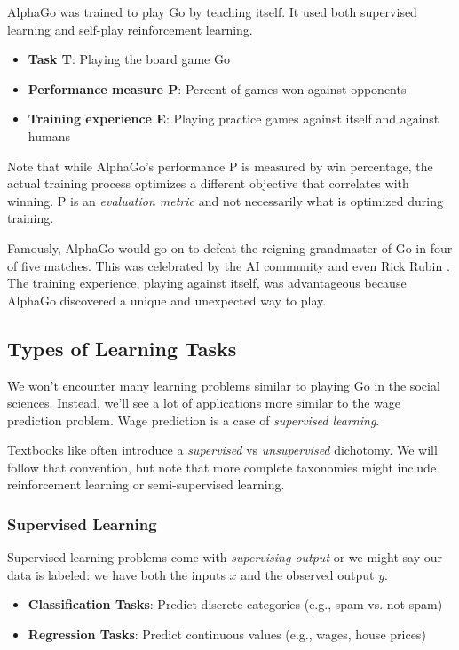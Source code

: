 AlphaGo was trained to play Go by teaching itself. It used both supervised learning and self-play reinforcement learning.

\begin{itemize}
\item \textbf{Task T}: Playing the board game Go
\item \textbf{Performance measure P}: Percent of games won against opponents
\item \textbf{Training experience E}: Playing practice games against itself and against humans
\end{itemize}

Note that while AlphaGo's performance P is measured by win percentage, the actual training process optimizes a different objective that correlates with winning. P is an \textit{evaluation metric} and not necessarily what is optimized during training.

Famously, AlphaGo would go on to defeat the reigning grandmaster of Go in four of five matches. This was celebrated by the AI community and even Rick Rubin \cite{rubin2023creative}. The training experience, playing against itself, was advantageous because AlphaGo discovered a unique and unexpected way to play.

\subsection{Types of Learning Tasks}

We won't encounter many learning problems similar to playing Go in the social sciences. Instead, we'll see a lot of applications more similar to the wage prediction problem. Wage prediction is a case of \textit{supervised learning}.

Textbooks like \cite{james2023introduction} often introduce a \textit{supervised} vs \textit{unsupervised} dichotomy. We will follow that convention, but note that more complete taxonomies might include reinforcement learning or semi-supervised learning.

\subsubsection{Supervised Learning}

Supervised learning problems come with \textit{supervising output} or we might say our data is labeled: we have both the inputs $x$ and the observed output $y$.

\begin{itemize}
\item \textbf{Classification Tasks}: Predict discrete categories (e.g., spam vs. not spam)
\item \textbf{Regression Tasks}: Predict continuous values (e.g., wages, house prices)
\end{itemize}

